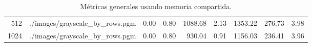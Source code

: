 \begin{table}[H]
\begin{adjustbox}{width=\textwidth, keepaspectratio}
\begin{tabular}{rlrrrrrrr}
                    512 & ./images/grayscale\_by\_rows.pgm & 0.00 & 0.80 & 1088.68 & 2.13 & 1353.22 & 276.73 & 3.98 \\
                    1024 & ./images/grayscale\_by\_rows.pgm & 0.00 & 0.80 & 930.04 & 0.91 & 1156.03 & 236.41 & 3.96 \\
                    \bottomrule
                \end{tabular}
            \end{adjustbox}
            \caption{Métricas generales usando memoria compartida.}
            \label{tab:histogram_metrics_shared}
        \end{table} 
